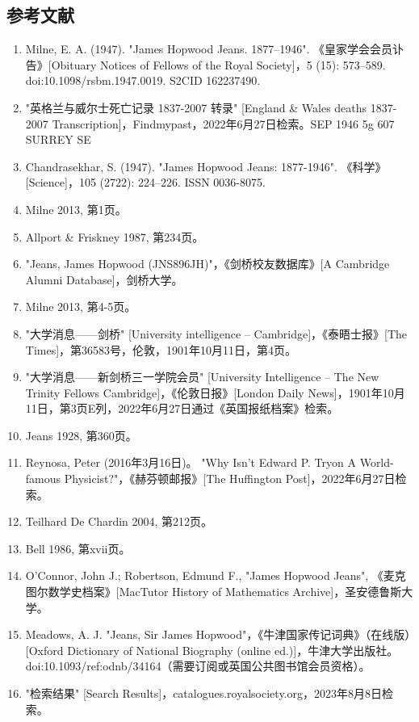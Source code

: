 \subsection{参考文献}  
\begin{enumerate}
\item Milne, E. A. (1947). "James Hopwood Jeans. 1877–1946". 《皇家学会会员讣告》[Obituary Notices of Fellows of the Royal Society]，5 (15): 573–589. doi:10.1098/rsbm.1947.0019. S2CID 162237490.  
\item "英格兰与威尔士死亡记录 1837-2007 转录" [England & Wales deaths 1837-2007 Transcription]，Findmypast，2022年6月27日检索。SEP 1946 5g 607 SURREY SE  
\item Chandrasekhar, S. (1947). "James Hopwood Jeans: 1877-1946". 《科学》[Science]，105 (2722): 224–226. ISSN 0036-8075.  
\item Milne 2013, 第1页。  
\item Allport & Friskney 1987, 第234页。  
\item "Jeans, James Hopwood (JNS896JH)"，《剑桥校友数据库》[A Cambridge Alumni Database]，剑桥大学。  
\item Milne 2013, 第4-5页。  
\item "大学消息——剑桥" [University intelligence – Cambridge]，《泰晤士报》[The Times]，第36583号，伦敦，1901年10月11日，第4页。  
\item "大学消息——新剑桥三一学院会员" [University Intelligence – The New Trinity Fellows Cambridge]，《伦敦日报》[London Daily News]，1901年10月11日，第3页E列，2022年6月27日通过《英国报纸档案》检索。  
\item Jeans 1928, 第360页。  
\item Reynosa, Peter (2016年3月16日)。 "Why Isn't Edward P. Tryon A World-famous Physicist?"，《赫芬顿邮报》[The Huffington Post]，2022年6月27日检索。  
\item Teilhard De Chardin 2004, 第212页。  
\item Bell 1986, 第xvii页。  
\item O'Connor, John J.; Robertson, Edmund F., "James Hopwood Jeans", 《麦克图尔数学史档案》[MacTutor History of Mathematics Archive]，圣安德鲁斯大学。  
\item Meadows, A. J. "Jeans, Sir James Hopwood"，《牛津国家传记词典》（在线版）[Oxford Dictionary of National Biography (online ed.)]，牛津大学出版社。doi:10.1093/ref:odnb/34164（需要订阅或英国公共图书馆会员资格）。  
\item "检索结果" [Search Results]，catalogues.royalsociety.org，2023年8月8日检索。  

\end{enumerate}
